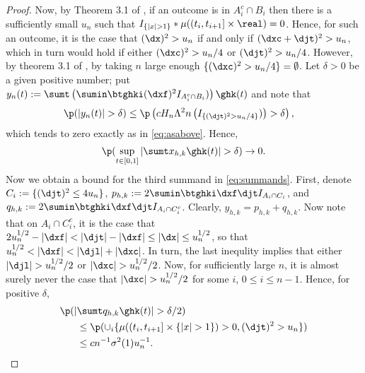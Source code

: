 \begin{proof}
Now, by Theorem 3.1 of \cite{Mancini2009}, if an outcome is  in $A_i^c \cap B_i$ then there is a sufficiently small $u_n$ such that $I_{\{\vert x \vert > 1\}} \ast \mu((t_i , t_{i + 1}  ] \times \real) = 0$. Hence, for such an outcome, it is the case that $ (\dx)^2> u_n$ if and only if  $ (\dxc + \djt)^2 > u_n$, which  in turn would hold if either $(\dxc)^2 > u_n/4$ or   $(\djt)^2 > u_n/4$. However, by theorem 3.1 of \cite{Mancini2009}, by taking $n$ large enough $\{ (\dxc)^2 > u_n/4 \} = \emptyset$. Let $\delta > 0$ be a given positive number; put $y_n(t) :=    \sumt\left(\sumin  \btghki(\dxf)^2 I_{A_i^c \cap B_i})\right)\ghk(t)$ and note that 
\begin{align}
  \p&(\vert y_n(t) \vert > \delta) \le \p\left(cH_n \Lambda^2n \left( I_{\{(\djt)^2 >u_n/4\}})\right) > \delta\right), \notag
  \label{}
\end{align}
which tends to zero exactly as in \eqref{eq:asabove}. Hence, \begin{align}\label{eq:x} \p(\sup_{t \in [0,1]}\vert \sumt x_{h,k} \ghk(t) \vert > \delta) \to 0. \end{align}
Now we obtain a bound for the third summand in  \eqref{eq:summands}. First, denote $C_i := \{( \djt )^2 \le 4 u_n\}$, $p_{h,k} : = 2 \sumin \btghki\dxf \djt I_{A_i \cap C_i}$, and $q_{h,k} := 2 \sumin \btghki\dxf \djt I_{A_i \cap C_i^c}$. Clearly, $y_{h,k} = p_{h,k} + q_{h,k}$. Now note that on $ A_i \cap C_i^c$, it is the case that  $2u_n^{1/2} - \vert \dxf \vert < \vert \djt\vert - \vert \dxf\vert \le \vert \dx \vert \le u_n^{1/2}$, so that $u_n^{1/2} < \vert \dxf \vert < \vert \djl \vert + \vert \dxc \vert$. In turn, the last inequlity implies that either $\vert \djl \vert > u^{1/2}_n/2$ or  $\vert \dxc \vert > u^{1/2}_n/2$. Now, for sufficiently large $n$, it is almost surely never the case that $\vert \dxc \vert > u^{1/2}_n/2$ for some $i$,  $0 \le  i  \le n -1$. Hence,  for positive $\delta$, \begin{align} \p(\vert&\sumt q_{h,k} \ghk(t) \vert > \delta/2) \notag \\ &\le \p(    \cup_i\{ \mu( (t_i, t_{i+1}] \times \{\vert x \vert > 1 \} ) > 0,  (\djt)^2 > u_n\}) \notag \\ & \le c n^{-1} \sigma^2(1) u_n^{-1}.\end{align}


\end{proof}
